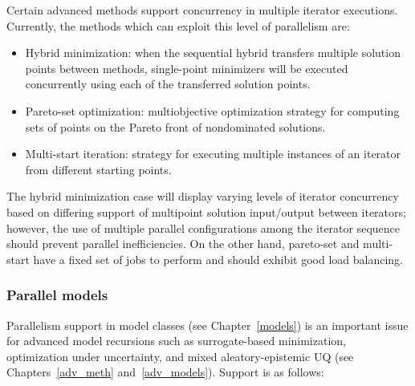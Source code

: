 Certain advanced methods support concurrency in multiple iterator
executions. Currently, the methods which can exploit this level of
parallelism are:

\begin{itemize}
\item Hybrid minimization: when the sequential hybrid transfers multiple
solution points between methods, single-point minimizers will be executed
concurrently using each of the transferred solution points.


\item Pareto-set optimization: multiobjective optimization strategy for
computing sets of points on the Pareto front of nondominated solutions.

\item Multi-start iteration: strategy for executing multiple instances
of an iterator from different starting points.
\end{itemize}

The hybrid minimization case will display varying levels of iterator 
concurrency based on differing support of multipoint solution input/output 
between iterators; however, the use of multiple parallel configurations 
among the iterator sequence should prevent parallel inefficiencies.  On 
the other hand, pareto-set and multi-start have a fixed set of jobs to 
perform and should exhibit good load balancing.

\subsubsection{Parallel models}\label{parallel:algorithms:models}

Parallelism support in model classes (see Chapter~\ref{models}) is an
important issue for 
advanced model recursions such as surrogate-based minimization,
optimization under uncertainty, and mixed aleatory-epistemic UQ (see
Chapters~\ref{adv_meth} and~\ref{adv_models}).  Support is as follows:


